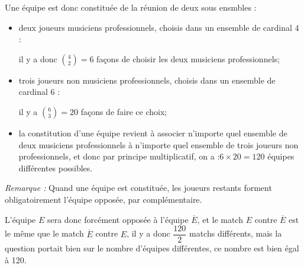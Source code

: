 \documentclass[10pt]{article}
\providecommand{\ds}{\displaystyle}
\begin{document}
\begin{enumerate}
	Une équipe est donc constituée de la réunion de deux sous ensmbles :
	\begin{itemize}
		\item deux joueurs musiciens professionnels, choisis dans un ensemble de cardinal 4 :

		il y a donc $\ds \binom{4}{2} = 6$ façons de choisir les deux musiciens professionnels;
		\item trois joueurs non musiciens professionnels, choisis dans un ensemble de cardinal 6 :

		il y a $\ds \binom{6}{3} = 20$ façons de faire ce choix;

		\item la constitution d'une équipe revient à associer n'importe quel ensemble de deux musiciens professionnels à n'importe quel ensemble de trois joueurs non professionnels, et donc par principe multiplicatif, on a :\quad $6 \times 20 = 120$ équipes différentes possibles.
	\end{itemize}

	\emph{Remarque :} Quand une équipe est constituée, les joueurs restants forment obligatoirement l'équipe opposée, par complémentaire.

	L'équipe $E$ sera donc forcément opposée à l'équipe $\overline{E}$, et le match $E$ contre $\overline{E}$ est le même que le match $\overline{E}$ contre $E$, il y a donc $\dfrac{120}{2}$ matchs différents, mais la question portait bien sur le nombre d'équipes différentes, ce nombre est bien égal à 120.


\end{enumerate}
\end{document}
